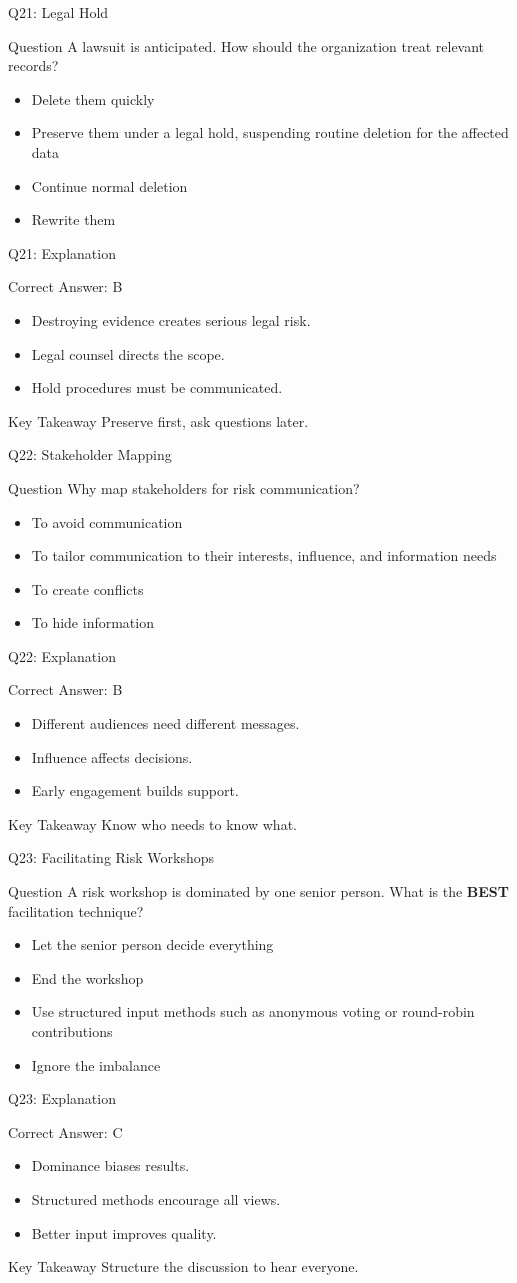 \documentclass[aspectratio=169]{beamer}
\newcommand{\hq}[7]{%
	\begin{frame}{Q#1: #2}
		\begin{block}{Question}
			#3
		\end{block}
		\begin{itemize}
			#4
		\end{itemize}
	\end{frame}
	\begin{frame}{Q#1: Explanation}
		\begin{block}{Correct Answer: #5}
			\begin{itemize}
				#6
			\end{itemize}
		\end{block}
		\begin{alertblock}{Key Takeaway}
			#7
		\end{alertblock}
	\end{frame}
}
\begin{document}
	\hq{21}{Legal Hold}
	{A lawsuit is anticipated. How should the organization treat relevant records?}
	{\item[\textbf{(A)}] Delete them quickly
		\item[\textbf{(B)}] Preserve them under a legal hold, suspending routine deletion for the affected data
		\item[\textbf{(C)}] Continue normal deletion
		\item[\textbf{(D)}] Rewrite them}
	{B}
	{\item Destroying evidence creates serious legal risk.
		\item Legal counsel directs the scope.
		\item Hold procedures must be communicated.}
	{Preserve first, ask questions later.}

	\hq{22}{Stakeholder Mapping}
	{Why map stakeholders for risk communication?}
	{\item[\textbf{(A)}] To avoid communication
		\item[\textbf{(B)}] To tailor communication to their interests, influence, and information needs
		\item[\textbf{(C)}] To create conflicts
		\item[\textbf{(D)}] To hide information}
	{B}
	{\item Different audiences need different messages.
		\item Influence affects decisions.
		\item Early engagement builds support.}
	{Know who needs to know what.}

	\hq{23}{Facilitating Risk Workshops}
	{A risk workshop is dominated by one senior person. What is the \textbf{BEST} facilitation technique?}
	{\item[\textbf{(A)}] Let the senior person decide everything
		\item[\textbf{(B)}] End the workshop
		\item[\textbf{(C)}] Use structured input methods such as anonymous voting or round-robin contributions
		\item[\textbf{(D)}] Ignore the imbalance}
	{C}
	{\item Dominance biases results.
		\item Structured methods encourage all views.
		\item Better input improves quality.}
	{Structure the discussion to hear everyone.}
\end{document}
